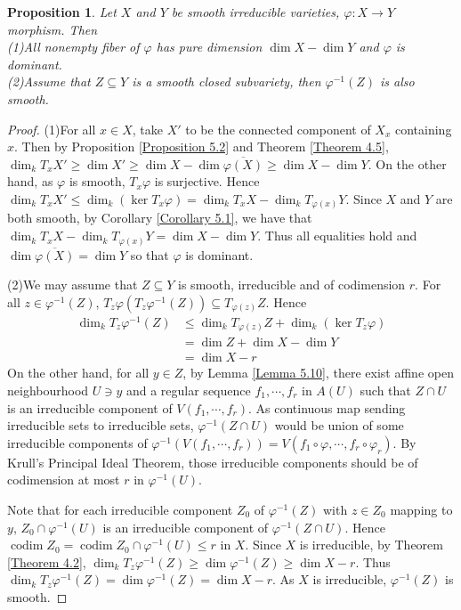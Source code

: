 \documentclass{ctexart}
\newtheorem{proposition}{Proposition}[section]
\newcommand{\codim}{\operatorname{codim}}
\begin{document}
\begin{proposition}
    Let $X$ and $Y$ be smooth irreducible varieties, $\varphi: X \rightarrow Y$ morphism.
    Then \\
    (1)All nonempty fiber of $\varphi$ has pure dimension $\dim X - \dim Y$ and $\varphi$ is dominant. \\
    (2)Assume that $Z \subseteq Y$ is a smooth closed subvariety,
    then $\varphi^{-1}(Z)$ is also smooth.
    \label{Proposition 5.5}
\end{proposition}
\begin{proof}
    (1)For all $x\in X$, take $X'$ to be the connected component of $X_{x}$ containing $x$.
    Then by Proposition \ref{Proposition 5.2} and Theorem \ref{Theorem 4.5}, $\dim_{k} T_{x}X' \ge \dim X' \ge \dim X - \dim \overline{\varphi(X)} \ge \dim X - \dim Y$.
    On the other hand, as $\varphi$ is smooth, $T_{x}\varphi$ is surjective.
    Hence $\dim_{k} T_{x}X' \le \dim_{k} (\ker T_{x}\varphi) = \dim_{k} T_{x}X - \dim_{k} T_{\varphi(x)}Y$.
    Since $X$ and $Y$ are both smooth, by Corollary \ref{Corollary 5.1}, we have that $\dim_{k} T_{x}X - \dim_{k} T_{\varphi(x)}Y = \dim X - \dim Y$.
    Thus all equalities hold and $\dim \overline{\varphi(X)} = \dim Y$ so that $\varphi$ is dominant.
    \par
    (2)We may assume that $Z \subseteq Y$ is smooth, irreducible and of codimension $r$.
    For all $z\in \varphi^{-1}(Z)$, $T_{z}\varphi(T_{z}\varphi^{-1}(Z)) \subseteq T_{\varphi(z)}Z$.
    Hence 
    \begin{equation}
        \begin{split}
            \dim_{k} T_{z}\varphi^{-1}(Z) & \le \dim_{k} T_{\varphi(z)}Z + \dim_{k} (\ker T_{z}\varphi) \\
            & = \dim Z + \dim X - \dim Y \\
            & = \dim X - r
        \end{split}
    \end{equation}
    On the other hand, for all $y\in Z$, by Lemma \ref{Lemma 5.10},
    there exist affine open neighbourhood $U\ni y$ and a regular sequence $f_{1}, \cdots, f_{r}$ in $A(U)$ such that $Z \cap U$ is an irreducible component of $V(f_{1}, \cdots, f_{r})$.
    As continuous map sending irreducible sets to irreducible sets, $\varphi^{-1}(Z \cap U)$ would be union of some irreducible components of $\varphi^{-1}(V(f_{1}, \cdots, f_{r})) = V(f_{1} \circ \varphi, \cdots, f_{r} \circ \varphi_{r})$.
    By Krull's Principal Ideal Theorem, those irreducible components should be of codimension at most $r$ in $\varphi^{-1}(U)$.
    \par
    Note that for each irreducible component $Z_{0}$ of $\varphi^{-1}(Z)$ with $z\in Z_{0}$ mapping to $y$,
    $Z_{0} \cap \varphi^{-1}(U)$ is an irreducible component of $\varphi^{-1}(Z \cap U)$.
    Hence $\codim Z_{0} = \codim Z_{0} \cap \varphi^{-1}(U) \le r$ in $X$.
    Since $X$ is irreducible, by Theorem \ref{Theorem 4.2}, $\dim_{k} T_{z}\varphi^{-1}(Z) \ge \dim \varphi^{-1}(Z) \ge \dim X - r$.
    Thus $\dim_{k} T_{z}\varphi^{-1}(Z) = \dim \varphi^{-1}(Z) = \dim X - r$.
    As $X$ is irreducible, $\varphi^{-1}(Z)$ is smooth.
\end{proof}
\end{document}
